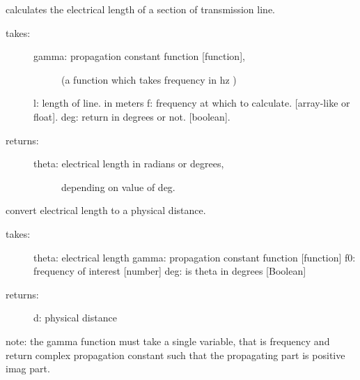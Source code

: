 \documentclass[letterpaper,10pt,english]{sphinxmanual}
\begin{document}

\begin{fulllineitems}
\label{api/mwavepy:mwavepy.tlineFunctions.electrical_length}
calculates the electrical length of a section of transmission line.
\begin{description}
\item[{takes:}] \leavevmode\begin{description}
\item[{gamma: propagation constant function {[}function{]}, }] \leavevmode
(a function which takes frequency in hz )

\end{description}

l: length of line. in meters
f: frequency at which to calculate. {[}array-like or float{]}. 
deg: return in degrees or not. {[}boolean{]}.

\item[{returns:}] \leavevmode\begin{description}
\item[{theta: electrical length in radians or degrees, }] \leavevmode
depending on  value of deg.

\end{description}

\end{description}

\end{fulllineitems}


\begin{fulllineitems}
\label{api/mwavepy:mwavepy.tlineFunctions.electrical_length_2_distance}
convert electrical length to a physical distance.
\begin{description}
\item[{takes:}] \leavevmode
theta: electrical length
gamma: propagation constant function {[}function{]}
f0:     frequency of interest {[}number{]}
deg: is theta in degrees {[}Boolean{]}

\item[{returns:}] \leavevmode
d: physical distance

\end{description}

note: the gamma function must take a single variable, that is 
frequency and return complex propagation constant such that the 
propagating part is positive imag part.

\end{fulllineitems}
\end{document}
